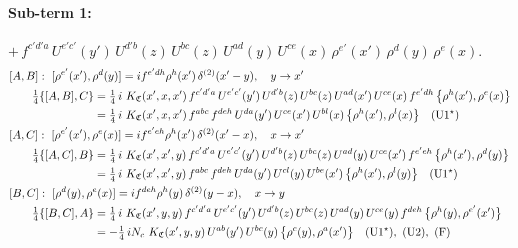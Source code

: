 \documentclass[10pt]{article}
\numberwithin{equation}{section}
\begin{document}
\paragraph{Sub-term 1:} $+\,f^{c'd'a}\,U^{e'c'}(y')\,U^{d'b}(z)\,U^{bc}(z)\,U^{ad}(y)\,U^{ce}(x)\,\rho^{e'}(x')\,\rho^{d}(y)\,\rho^{e}(x)$.
\begin{align}
&[A,B]:\ [\rho^{e'}(x'),\rho^{d}(y)]=i f^{e'dh}\rho^{h}(x')\,\delta^{(2)}(x'-y),\quad y\to x'\notag\\
&\qquad \tfrac14\{[A,B],C\}=\tfrac14\,i\,\,K_{\mathfrak C}(x',x,x')\,f^{c'd'a}\,U^{e'c'}(y')\,U^{d'b}(z)\,U^{bc}(z)\,U^{ad}(x')\,U^{ce}(x)\,f^{e'dh}\,\big\{\rho^{h}(x'),\rho^{e}(x)\big\}\notag\\
&\qquad\phantom{\tfrac14\{[A,B],C\}}=\tfrac14\,i\,\,K_{\mathfrak C}(x',x,x')\,f^{abc}\,f^{deh}\,U^{da}(y')\,U^{ce}(x')\,U^{bl}(x)\,\big\{\rho^{h}(x'),\rho^{l}(x)\big\}\quad\text{(U1$^\star$)}
\label{eq:GIII.VI-1-AB}\\
&[A,C]:\ [\rho^{e'}(x'),\rho^{e}(x)]=i f^{e'eh}\rho^{h}(x')\,\delta^{(2)}(x'-x),\quad x\to x'\notag\\
&\qquad \tfrac14\{[A,C],B\}=\tfrac14\,i\,\,K_{\mathfrak C}(x',x',y)\,f^{c'd'a}\,U^{e'c'}(y')\,U^{d'b}(z)\,U^{bc}(z)\,U^{ad}(y)\,U^{ce}(x')\,f^{e'eh}\,\big\{\rho^{h}(x'),\rho^{d}(y)\big\}\notag\\
&\qquad\phantom{\tfrac14\{[A,C],B\}}=\tfrac14\,i\,\,K_{\mathfrak C}(x',x',y)\,f^{abc}\,f^{deh}\,U^{da}(y')\,U^{cl}(y)\,U^{be}(x')\,\big\{\rho^{h}(x'),\rho^{l}(y)\big\}\quad\text{(U1$^\star$)}
\label{eq:GIII.VI-1-AC}\\
&[B,C]:\ [\rho^{d}(y),\rho^{e}(x)]=i f^{deh}\rho^{h}(y)\,\delta^{(2)}(y-x),\quad x\to y\notag\\
&\qquad \tfrac14\{[B,C],A\}=\tfrac14\,i\,\,K_{\mathfrak C}(x',y,y)\,f^{c'd'a}\,U^{e'c'}(y')\,U^{d'b}(z)\,U^{bc}(z)\,U^{ad}(y)\,U^{ce}(y)\,f^{deh}\,\big\{\rho^{h}(y),\rho^{e'}(x')\big\}\notag\\
&\qquad\phantom{\tfrac14\{[B,C],A\}}=-\tfrac14\,i N_{c}\,\,K_{\mathfrak C}(x',y,y)\,U^{ab}(y')\,U^{bc}(y)\,\big\{\rho^{c}(y),\rho^{a}(x')\big\}\quad\text{(U1$^\star$)},\ \text{(U2)},\ \text{(F)}
\label{eq:GIII.VI-1-BC}
\end{align}
\end{document}
